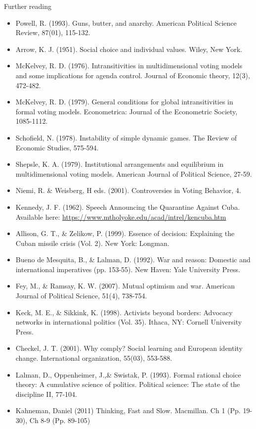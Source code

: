 \documentclass[12pt,a4paper]{article}
\begin{document}
\noindent Further reading

\begin{itemize}
	\item Powell, R. (1993). Guns, butter, and anarchy. American Political Science Review, 87(01), 115-132.
	\item Arrow, K. J. (1951). Social choice and individual values. Wiley, New York.
	\item McKelvey, R. D. (1976). Intransitivities in multidimensional voting models and some implications for agenda control. Journal of Economic theory, 12(3), 472-482.
	\item McKelvey, R. D. (1979). General conditions for global intransitivities in formal voting models. Econometrica: Journal of the Econometric Society, 1085-1112.
	\item Schofield, N. (1978). Instability of simple dynamic games. The Review of Economic Studies, 575-594.
	\item Shepsle, K. A. (1979). Institutional arrangements and equilibrium in multidimensional voting models. American Journal of Political Science, 27-59.
	\item Niemi, R. \& Weisberg, H eds. (2001). Controversies in Voting Behavior, 4.
	\item Kennedy, J. F. (1962). Speech Announcing the Quarantine Against Cuba. Available here: \url{https://www.mtholyoke.edu/acad/intrel/kencuba.htm}
	\item Allison, G. T., \& Zelikow, P. (1999). Essence of decision: Explaining the Cuban missile crisis (Vol. 2). New York: Longman.
	\item Bueno de Mesquita, B., \& Lalman, D. (1992). War and reason: Domestic and international imperatives (pp. 153-55). New Haven: Yale University Press.
	\item Fey, M., \& Ramsay, K. W. (2007). Mutual optimism and war. American Journal of Political Science, 51(4), 738-754.
	\item Keck, M. E., \& Sikkink, K. (1998). Activists beyond borders: Advocacy networks in international politics (Vol. 35). Ithaca, NY: Cornell University Press.
	\item Checkel, J. T. (2001). Why comply? Social learning and European identity change. International organization, 55(03), 553-588.
	\item Lalman, D., Oppenheimer, J.,\& Swistak, P. (1993). Formal rational choice theory: A cumulative science of politics. Political science: The state of the discipline II, 77-104.
	\item Kahneman, Daniel (2011) Thinking, Fast and Slow. Macmillan. Ch 1 (Pp. 19-30), Ch 8-9 (Pp. 89-105)
\end{itemize}
\end{document}
